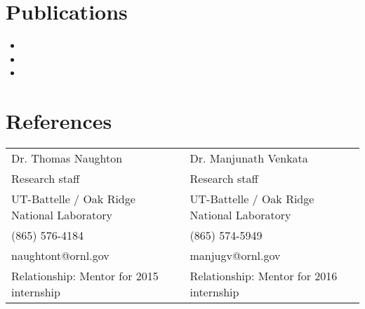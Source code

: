 \documentclass[10pt]{res}
\begin{document}
\begin{resume}
\section{Publications}
\begin{itemize}
    \item {}
    \item {}
    \item {}
\end{itemize}

\section{References}
\vspace{2mm}
\begin{tabularx}{\textwidth}{X X}
Dr. Thomas Naughton  & Dr. Manjunath Venkata \\
Research staff & Research staff \\
UT-Battelle / Oak Ridge National Laboratory & UT-Battelle / Oak Ridge National Laboratory \\
(865) 576-4184 & (865) 574-5949 \\
naughtont@ornl.gov & manjugv@ornl.gov \\
Relationship: Mentor for 2015 internship & Relationship: Mentor for 2016 internship
\end{tabularx}
%
\end{resume}
\end{document}
